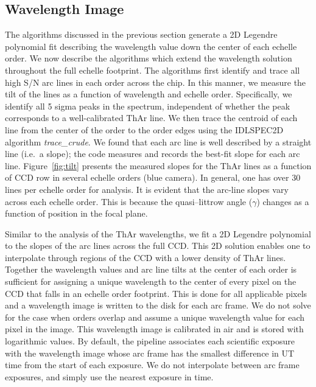 \documentclass[12pt,preprint]{aastex}
\begin{document}
\subsection{Wavelength Image}
\label{sec:arcimg}

The algorithms discussed in the previous section 
generate a 2D Legendre polynomial fit describing the 
wavelength value down the center of each echelle order.
We now describe the algorithms which extend the wavelength
solution throughout the full echelle footprint.
The algorithms first identify and trace all high S/N arc
lines in each order across the chip.  In this manner, we measure the tilt
of the lines as a function of wavelength and echelle order.
Specifically, we identify all 5 sigma peaks in the spectrum,
independent of whether the peak corresponds to a well-calibrated 
ThAr line.  We then trace the centroid of each
line from the center of the order to the order edges
using the IDLSPEC2D algorithm {\it trace\_crude}.
We found that each arc line is well described by a straight line
(i.e.\ a slope); the code measures and records the best-fit slope
for each arc line.   
Figure~\ref{fig:tilt} presents the measured slopes 
for the ThAr lines 
as a function of CCD row 
in several echelle orders (blue camera).
In general, one has over 30 lines per echelle order for analysis.  
It is evident that the arc-line slopes vary across each echelle order.  
This is because the quasi--littrow angle ($\gamma$) changes as a function
of position in the focal plane.

Similar to the analysis of the ThAr wavelengths,
we fit a 2D Legendre polynomial
to the slopes of the arc lines across the full CCD.
This 2D solution enables one to 
interpolate through regions of the CCD with a lower density of 
ThAr lines.
Together the wavelength values and arc line tilts
at the center of each order is sufficient 
for assigning a unique wavelength to the center of every pixel
on the CCD that falls in an echelle order footprint.
This is done for all applicable pixels and
a wavelength image is written to the disk for each arc frame.
We do not solve for the case when orders overlap and assume a
unique wavelength value for each pixel in the image.
This wavelength image is calibrated in air and is stored with 
logarithmic values.
By default, the pipeline associates each scientific exposure with
the wavelength image whose arc frame has the smallest difference
in UT time from the start of each exposure.  We do not interpolate
between arc frame exposures, and simply use the nearest exposure in time.
\end{document}
